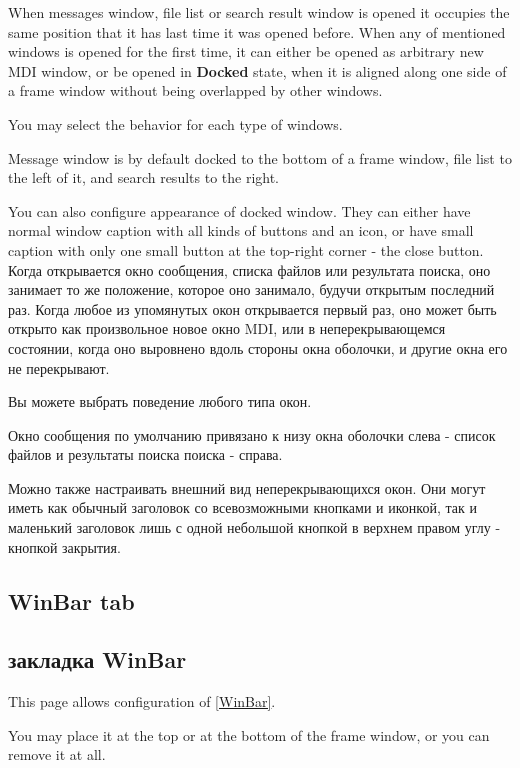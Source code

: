 \ifenglish
When messages window, file list or search result window is opened it occupies
the same position that it has last time it was opened before. When any of
mentioned windows is opened for the first time, it can either be opened as
arbitrary new MDI window, or be opened in {\bf Docked} state, when it is aligned
along one side of a frame window without being overlapped by other windows.

You may select the behavior for each type of windows.

Message window is by default docked to the bottom of a frame window, file list to
the left of it, and search results to the right.

You can also configure appearance of docked window. They can either have normal
window caption with all kinds of buttons and an icon, or have small caption
with only one small button at the top-right corner - the close button.
 \else
Когда открывается окно сообщения, списка файлов или результата поиска, оно 
занимает то же положение, которое оно занимало, будучи открытым последний раз.
Когда любое из упомянутых окон открывается первый раз, оно может быть открыто
как произвольное новое окно MDI, или в неперекрывающемся состоянии, когда оно 
выровнено вдоль стороны окна оболочки, и другие окна его не перекрывают.

Вы можете выбрать поведение любого типа окон.

Окно сообщения по умолчанию привязано к низу окна оболочки слева - список 
файлов и результаты поиска поиска - справа. 
                                          
Можно также настраивать внешний вид неперекрывающихся окон. Они могут иметь 
как обычный заголовок со всевозможными кнопками и иконкой, так и  
маленький заголовок лишь с одной небольшой кнопкой в верхнем правом углу 
- кнопкой закрытия.
\fi

\ifenglish
\subsection {WinBar tab}
 \else
\subsection {закладка WinBar}
 \fi
{}

\ifenglish
This page allows configuration of \ref{WinBar}.

You may place it at the top or at the bottom of the frame window, or you
can remove it at all.

